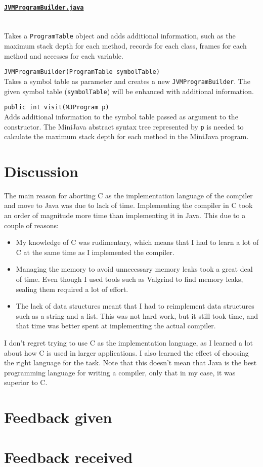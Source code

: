 \documentclass[11pt,oneside,a4paper]{article}
\newcommand{\code}[1]{\texttt{#1}}
\newcommand{\class}[1]{\underline{\texttt{#1}}}
\begin{document}
\paragraph{\class{JVMProgramBuilder.java}} \hfill \\
Takes a \code{ProgramTable} object and adds additional information, such as the
maximum stack depth for each method, records for each class, frames for each
method and accesses for each variable.
\label{par:JVMProgramBuilder}
\begin{description}
    \item{\code{JVMProgramBuilder(ProgramTable symbolTable)}} \hfill \\
        Takes a symbol table as parameter and creates a new
        \code{JVMProgramBuilder}. The given symbol table (\code{symbolTable})
        will be enhanced with additional information.
    \item{\code{public int visit(MJProgram p)}} \hfill \\
        Adds additional information to the symbol table passed as argument to
        the constructor. The MiniJava abstract syntax tree represented by
        \code{p} is needed to calculate the maximum stack depth for each method
        in the MiniJava program.
\end{description}

\section{Discussion}
\label{sec:discussion}
The main reason for aborting C as the implementation language of the compiler
and move to Java was due to lack of time. Implementing the compiler in C took 
an order of magnitude more time than implementing it in Java. This due to a 
couple of reasons:
\begin{itemize}
\item
    My knowledge of C was rudimentary, which means that I had to learn a lot of
    C at the same time as I implemented the compiler.
\item
    Managing the memory to avoid unnecessary memory leaks took a great deal of
    time. Even though I used tools such as Valgrind to find memory leaks,
    sealing them required a lot of effort.
\item
    The lack of data structures meant that I had to reimplement data structures
    such as a string and a list. This was not hard work, but it still
    took time, and that time was better spent at implementing the actual 
    compiler. 
\end{itemize}
I don't regret trying to use C as the implementation language, as I learned a
lot about how C is used in larger applications. I also learned the effect of
choosing the right language for the task. Note that this doesn't mean that Java 
is the best programming language for writing a compiler, 
only that in my case, it was superior to C.

\appendix
\section{Feedback given}
\section{Feedback received}
\end{document}
